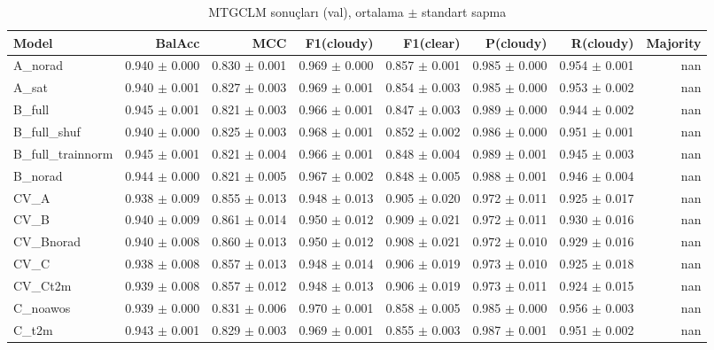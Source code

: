 \begin{table}[ht]
\centering
\caption{MTGCLM sonuçları (val), ortalama $\pm$ standart sapma}
\label{tab:results_val}
\begin{tabular}{lrrrrrrr}
\hline
Model & BalAcc & MCC & F1(cloudy) & F1(clear) & P(cloudy) & R(cloudy) & Majority \\
\hline
A\_norad & 0.940 $\pm$ 0.000 & 0.830 $\pm$ 0.001 & 0.969 $\pm$ 0.000 & 0.857 $\pm$ 0.001 & 0.985 $\pm$ 0.000 & 0.954 $\pm$ 0.001 & nan \\
A\_sat & 0.940 $\pm$ 0.001 & 0.827 $\pm$ 0.003 & 0.969 $\pm$ 0.001 & 0.854 $\pm$ 0.003 & 0.985 $\pm$ 0.000 & 0.953 $\pm$ 0.002 & nan \\
B\_full & 0.945 $\pm$ 0.001 & 0.821 $\pm$ 0.003 & 0.966 $\pm$ 0.001 & 0.847 $\pm$ 0.003 & 0.989 $\pm$ 0.000 & 0.944 $\pm$ 0.002 & nan \\
B\_full\_shuf & 0.940 $\pm$ 0.000 & 0.825 $\pm$ 0.003 & 0.968 $\pm$ 0.001 & 0.852 $\pm$ 0.002 & 0.986 $\pm$ 0.000 & 0.951 $\pm$ 0.001 & nan \\
B\_full\_trainnorm & 0.945 $\pm$ 0.001 & 0.821 $\pm$ 0.004 & 0.966 $\pm$ 0.001 & 0.848 $\pm$ 0.004 & 0.989 $\pm$ 0.001 & 0.945 $\pm$ 0.003 & nan \\
B\_norad & 0.944 $\pm$ 0.000 & 0.821 $\pm$ 0.005 & 0.967 $\pm$ 0.002 & 0.848 $\pm$ 0.005 & 0.988 $\pm$ 0.001 & 0.946 $\pm$ 0.004 & nan \\
CV\_A & 0.938 $\pm$ 0.009 & 0.855 $\pm$ 0.013 & 0.948 $\pm$ 0.013 & 0.905 $\pm$ 0.020 & 0.972 $\pm$ 0.011 & 0.925 $\pm$ 0.017 & nan \\
CV\_B & 0.940 $\pm$ 0.009 & 0.861 $\pm$ 0.014 & 0.950 $\pm$ 0.012 & 0.909 $\pm$ 0.021 & 0.972 $\pm$ 0.011 & 0.930 $\pm$ 0.016 & nan \\
CV\_Bnorad & 0.940 $\pm$ 0.008 & 0.860 $\pm$ 0.013 & 0.950 $\pm$ 0.012 & 0.908 $\pm$ 0.021 & 0.972 $\pm$ 0.010 & 0.929 $\pm$ 0.016 & nan \\
CV\_C & 0.938 $\pm$ 0.008 & 0.857 $\pm$ 0.013 & 0.948 $\pm$ 0.014 & 0.906 $\pm$ 0.019 & 0.973 $\pm$ 0.010 & 0.925 $\pm$ 0.018 & nan \\
CV\_Ct2m & 0.939 $\pm$ 0.008 & 0.857 $\pm$ 0.012 & 0.948 $\pm$ 0.013 & 0.906 $\pm$ 0.019 & 0.973 $\pm$ 0.011 & 0.924 $\pm$ 0.015 & nan \\
C\_noawos & 0.939 $\pm$ 0.000 & 0.831 $\pm$ 0.006 & 0.970 $\pm$ 0.001 & 0.858 $\pm$ 0.005 & 0.985 $\pm$ 0.000 & 0.956 $\pm$ 0.003 & nan \\
C\_t2m & 0.943 $\pm$ 0.001 & 0.829 $\pm$ 0.003 & 0.969 $\pm$ 0.001 & 0.855 $\pm$ 0.003 & 0.987 $\pm$ 0.001 & 0.951 $\pm$ 0.002 & nan \\

\end{tabular}
\end{table}
